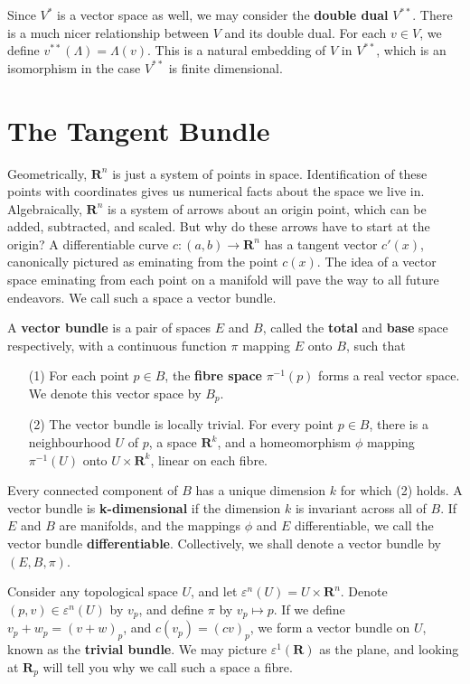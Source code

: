 Since $V^*$ is a vector space as well, we may consider the {\bf double dual} $V^{**}$. There is a much nicer relationship between $V$ and its double dual. For each $v \in V$, we define $v^{**}(\Lambda) = \Lambda(v)$. This is a natural embedding of $V$ in $V^{**}$, which is an isomorphism in the case $V^{**}$ is finite dimensional.


\chapter{The Tangent Bundle}

Geometrically, $\mathbf{R}^n$ is just a system of points in space. Identification of these points with coordinates gives us numerical facts about the space we live in. Algebraically, $\mathbf{R}^n$ is a system of arrows about an origin point, which can be added, subtracted, and scaled. But why do these arrows have to start at the origin? A differentiable curve $c:(a,b) \to \mathbf{R}^n$ has a tangent vector $c'(x)$, canonically pictured as eminating from the point $c(x)$. The idea of a vector space eminating from each point on a manifold will pave the way to all future endeavors. We call such a space a vector bundle.

\begin{definition}
    A {\bf vector bundle} is a pair of spaces $E$ and $B$, called the {\bf total} and {\bf base} space respectively, with a continuous function $\pi$ mapping $E$ onto $B$, such that
    \begin{enumerate}
        \item[(1)] For each point $p \in B$, the {\bf fibre space} $\pi^{-1}(p)$ forms a real vector space. We denote this vector space by $B_p$.
        \item[(2)] The vector bundle is locally trivial. For every point $p \in B$, there is a neighbourhood $U$ of $p$, a space $\mathbf{R}^k$, and a homeomorphism $\phi$ mapping $\pi^{-1}(U)$ onto $U \times \mathbf{R}^k$, linear on each fibre.
    \end{enumerate}
    Every connected component of $B$ has a unique dimension $k$ for which (2) holds. A vector bundle is {\bf k-dimensional} if the dimension $k$ is invariant across all of $B$. If $E$ and $B$ are manifolds, and the mappings $\phi$ and $E$ differentiable, we call the vector bundle {\bf differentiable}. Collectively, we shall denote a vector bundle by $(E,B,\pi)$.
\end{definition}

\begin{example}
    Consider any topological space $U$, and let $\varepsilon^n(U) = U \times \mathbf{R}^n$. Denote $(p,v) \in \varepsilon^n(U)$ by $v_p$, and define $\pi$ by $v_p \mapsto p$. If we define $v_p + w_p = (v + w)_p$, and $c(v_p) = (cv)_p$, we form a vector bundle on $U$, known as the {\bf trivial bundle}. We may picture $\varepsilon^1(\mathbf{R})$ as the plane, and looking at $\mathbf{R}_p$ will tell you why we call such a space a fibre.
\end{example}

